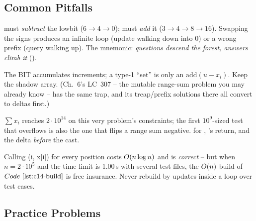 \subsection{Common Pitfalls}

\begin{warningbox}
 must \emph{subtract} the lowbit (\(6{\to}4{\to}0\));
 must \emph{add} it (\(3{\to}4{\to}8{\to}16\)).  Swapping the
signs produces an infinite loop (update walking down into \(0\)) or a wrong
prefix (query walking up).  The mnemonic: \emph{questions descend the forest,
answers climb it} ().
\end{warningbox}

\begin{warningbox}
The BIT accumulates increments; a type-1 ``set'' is only an
\(\text{add}(u - x_i)\).  Keep the shadow array.  (Ch.~6's LC~307 -- the
mutable range-sum problem you may already know -- has the same trap, and its
treap/prefix solutions there all convert to deltas first.)
\end{warningbox}

\begin{warningbox}
\(\sum x_i\) reaches \(2\cdot10^{14}\) on this very problem's constraints;
the first \(10^9\)-sized test that overflows is also the one that flips a
range sum negative.   for , 's return,
and the delta \emph{before} the cast.
\end{warningbox}

\begin{warningbox}
Calling (i, x[i]) for every position costs \(O(n\log n)\)
and is \emph{correct} -- but when \(n=2\cdot10^5\) and the time limit is
1.00\,s with several test files, the \(O(n)\) build of
\(\coderef{c14-build}\) is free insurance.  Never rebuild by updates inside
a loop over test cases.
\end{warningbox}

\subsection{Practice Problems}

